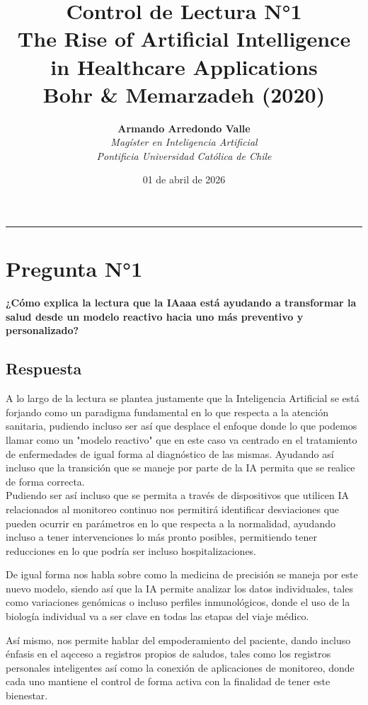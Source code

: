 \documentclass[12pt,a4paper]{article}
\title{\vspace{-1cm}
\huge\textbf{Control de Lectura N°1} \\
\Large\textbf{The Rise of Artificial Intelligence in Healthcare Applications} \\
\vspace{0.5cm}
\large{Bohr \& Memarzadeh (2020)}}
\author{\textbf{Armando Arredondo Valle} \\
\textit{Magíster en Inteligencia Artificial} \\
\textit{Pontificia Universidad Católica de Chile}}
\date{01 de abril de 2026}
\begin{document}
\maketitle
\thispagestyle{fancy}

\vspace{0.5cm}

\vspace{0.5cm}
\hrule
\vspace{0.5cm}

\section*{Pregunta N°1}
\textbf{¿Cómo explica la lectura que la IAaaa está ayudando a transformar la salud desde un modelo reactivo hacia uno más preventivo y personalizado?}

\subsection*{Respuesta}
A lo largo de la lectura se plantea justamente que la Inteligencia Artificial se está forjando como un paradigma fundamental en lo que respecta a la atención sanitaria, pudiendo incluso ser así que desplace el enfoque donde lo que podemos llamar como un "modelo reactivo" que en este caso va centrado en el tratamiento de enfermedades de igual forma al diagnóstico de las mismas. Ayudando así incluso que la transición que se maneje por parte de la IA permita que se realice de forma correcta.\\

Pudiendo ser así incluso que se permita a través de dispositivos que utilicen IA relacionados al monitoreo continuo nos permitirá identificar desviaciones que pueden ocurrir en parámetros en lo que respecta a la normalidad, ayudando incluso a tener intervenciones lo más pronto posibles, permitiendo tener reducciones en lo que podría ser incluso hospitalizaciones.


De igual forma nos habla sobre como la medicina de precisión se maneja por este nuevo modelo, siendo así que la IA permite analizar los datos individuales, tales como variaciones genómicas o incluso perfiles inmunológicos, donde el uso de la biología individual va a ser clave en todas las etapas del viaje médico.


Así mismo, nos permite hablar del empoderamiento del paciente, dando incluso énfasis en el aqcceso a registros propios de saludos, tales como los registros personales inteligentes así como la conexión de aplicaciones de monitoreo, donde cada uno mantiene el control de forma activa con la finalidad de tener este bienestar.
\end{document}
